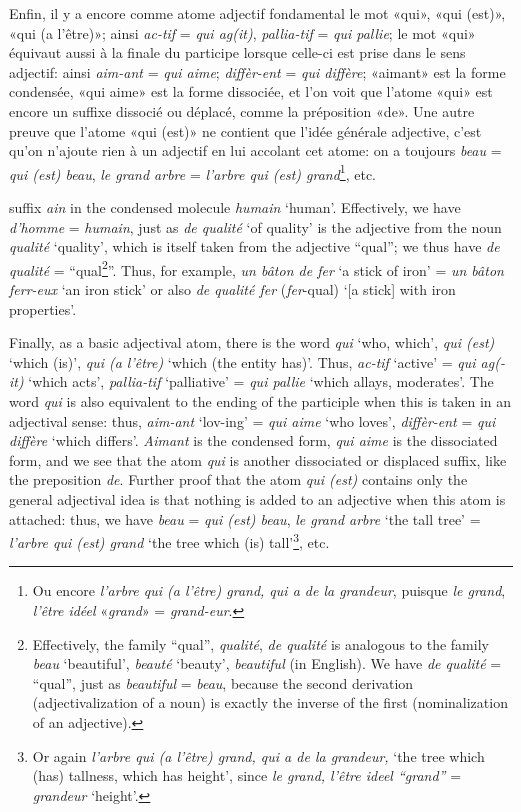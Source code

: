 \begin{sloppypar}
{  Enfin, il y a encore comme atome adjectif fondamental le mot «qui»,
  «qui (est)», «qui (a l’être)»; ainsi \emph{ac-tif} = \emph{qui
    ag(it)}, \emph{pallia-tif} = \emph{qui pallie}; le mot «qui»
  équivaut aussi à la finale du participe lorsque celle-ci est prise
  dans le sens adjectif: ainsi \emph{aim-ant} = \emph{qui aime};
  \emph{diffèr-ent} = \emph{qui diffère}; «aimant» est la forme
  condensée, «qui aime» est la forme dissociée, et l’on voit que
  l’atome «qui» est encore un suffixe dissocié ou déplacé, comme la
  préposition «de». Une autre preuve que l’atome «qui (est)» ne
  contient que l’idée générale adjective, c’est qu’on n’ajoute rien à
  un adjectif en lui accolant cet atome: on a toujours \emph{beau}
  =\emph{ qui (est) beau}, \emph{le grand arbre} = \emph{l’arbre qui
    (est) grand}\footnote{Ou encore \emph{l’arbre qui (a l’être)
      grand, qui a de la grandeur}, puisque \emph{le grand},
    \emph{l'être idéel }«\emph{grand}» = \emph{grand-eur}.}, etc.  }
{\noindent suffix \emph{ain} in the condensed molecule \emph{humain}
  `human'. Effectively, we have \emph{d'homme} = \emph{humain}, just
  as \emph{de qualité} `of quality' is the adjective from the noun
  \emph{qualité} `quality', which is itself taken from the adjective
  ``qual''; we thus have \emph{de qualité} =
  ``qual\footnote{Effectively, the family ``qual'', \emph{qualité},
    \emph{de qualité} is analogous to the family \emph{beau}
    `beautiful', \emph{beauté} `beauty', \emph{beautiful} (in
    English). We have \emph{de qualité} = ``qual'', just as
    \emph{beautiful} = \emph{beau}, because the second derivation
    (adjectivalization of a noun) is exactly the inverse of the first
    (nominalization of an adjective).}''. Thus, for example, \emph{un
    bâton de fer} `a stick of iron' = \emph{un bâton ferr-eux} `an
  iron stick' or also \emph{de qualité fer} (\emph{fer}-qual) `{[a
    stick]} with iron properties'.

  Finally, as a basic adjectival atom, there is the word \emph{qui}
  `who, which', \emph{qui (est)} `which (is)', \emph{qui (a l'être)}
  `which (the entity has)'. Thus, \emph{ac-tif} `active' = \emph{qui
    ag(-it)} `which acts', \emph{pallia-tif} `palliative' = \emph{qui
    pallie} `which allays, moderates'.  The word \emph{qui} is also
  equivalent to the ending of the participle when this is taken in an
  adjectival sense: thus, \emph{aim-ant} `lov-ing' = \emph{qui aime}
  `who loves', \emph{diffèr-ent} = \emph{qui diffère} `which
  differs'.  \emph{Aimant} is the condensed form, \emph{qui aime} is
  the dissociated form, and we see that the atom \emph{qui} is another
  dissociated or displaced suffix, like the preposition
  \emph{de}. Further proof that the atom \emph{qui (est)} contains
  only the general adjectival idea is that nothing is added to an
  adjective when this atom is attached: thus, we have \emph{beau} =
  \emph{qui (est) beau}, \emph{le grand arbre} `the tall tree' =
  \emph{l'arbre qui (est) grand} `the tree which (is) tall'\footnote{Or
    again \emph{l'arbre qui (a l'être) grand, qui a de la grandeur,}
    `the tree which (has) tallness, which has height', since \emph{le
      grand, l'être ideel ``grand''} = \emph{grandeur} `height'.},
  etc.

}
\end{sloppypar}
